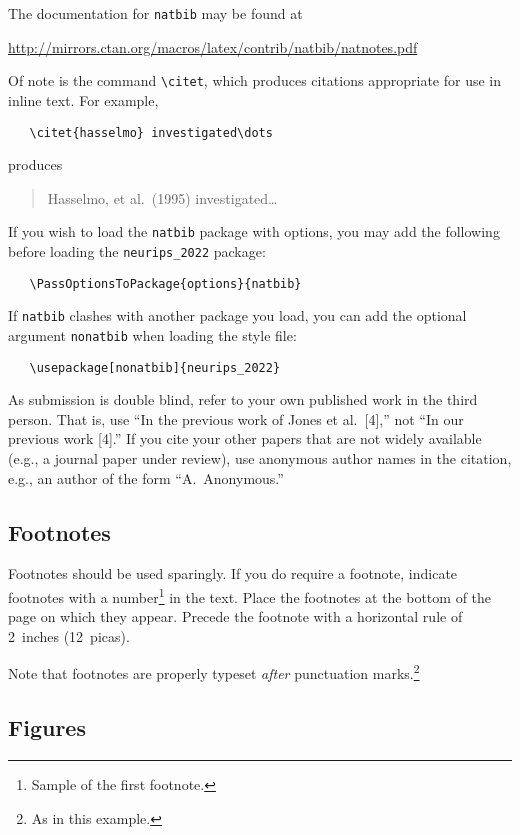 \documentclass{article}
\begin{document}
The documentation for \verb+natbib+ may be found at
\begin{center}
      \url{http://mirrors.ctan.org/macros/latex/contrib/natbib/natnotes.pdf}
\end{center}
Of note is the command \verb+\citet+, which produces citations appropriate for
use in inline text.  For example,
\begin{verbatim}
   \citet{hasselmo} investigated\dots
\end{verbatim}
produces
\begin{quote}
      Hasselmo, et al.\ (1995) investigated\dots
\end{quote}

If you wish to load the \verb+natbib+ package with options, you may add the
following before loading the \verb+neurips_2022+ package:
\begin{verbatim}
   \PassOptionsToPackage{options}{natbib}
\end{verbatim}

If \verb+natbib+ clashes with another package you load, you can add the
optional argument \verb+nonatbib+ when loading the style file:
\begin{verbatim}
   \usepackage[nonatbib]{neurips_2022}
\end{verbatim}

As submission is double blind, refer to your own published work in the third
person. That is, use ``In the previous work of Jones et al.\ [4],'' not ``In
our previous work [4].'' If you cite your other papers that are not widely
available (e.g., a journal paper under review), use anonymous author names in
the citation, e.g., an author of the form ``A.\ Anonymous.''

\subsection{Footnotes}

Footnotes should be used sparingly. If you do require a footnote, indicate
footnotes with a number\footnote{Sample of the first footnote.} in the text.
Place the footnotes at the bottom of the page on which they appear. Precede the
footnote with a horizontal rule of 2~inches (12~picas).

Note that footnotes are properly typeset \emph{after} punctuation
marks.\footnote{As in this example.}

\subsection{Figures}
\end{document}

